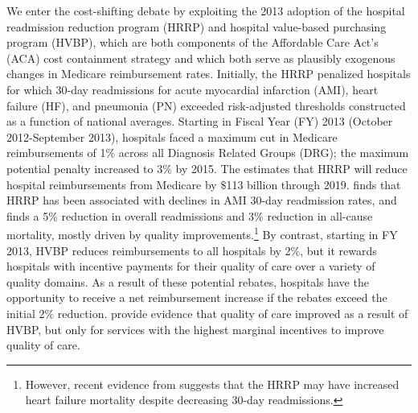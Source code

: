 \documentclass[12pt]{article}
\begin{document}
We enter the cost-shifting debate by exploiting the 2013 adoption of the hospital readmission reduction program (HRRP) and hospital value-based purchasing program (HVBP), which are both components of the Affordable Care Act's (ACA) cost containment strategy and which both serve as plausibly exogenous changes in Medicare reimbursement rates.  Initially, the HRRP penalized hospitals for which 30-day readmissions for acute myocardial infarction (AMI), heart failure (HF), and pneumonia (PN) exceeded risk-adjusted thresholds constructed as a function of national averages.  Starting in Fiscal Year (FY) 2013 (October 2012-September 2013), hospitals faced a maximum cut in Medicare reimbursements of 1$\%$ across all Diagnosis Related Groups (DRG); the maximum potential penalty increased to 3$\%$ by 2015.  The \cite{cbo2010} estimates that HRRP will reduce hospital reimbursements from Medicare by $\$$113 billion through 2019.  \citet{mellor2016} finds that HRRP has been associated with declines in AMI 30-day readmission rates, and \citet{gupta2016} finds a 5$\%$ reduction in overall readmissions and 3$\%$ reduction in all-cause mortality, mostly driven by quality improvements.\footnote{However, recent evidence from \citet{gupta2017} suggests that the HRRP may have increased heart failure mortality despite decreasing 30-day readmissions.}  By contrast, starting in FY 2013, HVBP reduces reimbursements to all hospitals by 2$\%$, but it rewards hospitals with incentive payments for their quality of care over a variety of quality domains. As a result of these potential rebates, hospitals have the opportunity to receive a net reimbursement increase if the rebates exceed the initial 2$\%$ reduction.  \citet{norton2016} provide evidence that quality of care improved as a result of HVBP, but only for services with the highest marginal incentives to improve quality of care.
\end{document}

